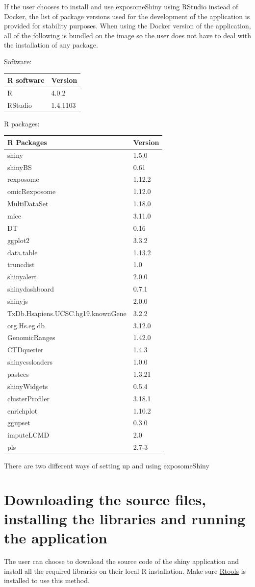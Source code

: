 \documentclass[
]{book}
\begin{document}
If the user chooses to install and use exposomeShiny using RStudio instead of Docker, the list of package versions used for the development of the application is provided for stability purposes. When using the Docker version of the application, all of the following is bundled on the image so the user does not have to deal with the installation of any package.

Software:

\begin{longtable}[]{@{}ll@{}}
\toprule
R software & Version\tabularnewline
\midrule
\endhead
R & 4.0.2\tabularnewline
RStudio & 1.4.1103\tabularnewline
\bottomrule
\end{longtable}

R packages:

\begin{longtable}[]{@{}ll@{}}
\toprule
R Packages & Version\tabularnewline
\midrule
\endhead
shiny & 1.5.0\tabularnewline
shinyBS & 0.61\tabularnewline
rexposome & 1.12.2\tabularnewline
omicRexposome & 1.12.0\tabularnewline
MultiDataSet & 1.18.0\tabularnewline
mice & 3.11.0\tabularnewline
DT & 0.16\tabularnewline
ggplot2 & 3.3.2\tabularnewline
data.table & 1.13.2\tabularnewline
truncdist & 1.0\tabularnewline
shinyalert & 2.0.0\tabularnewline
shinydashboard & 0.7.1\tabularnewline
shinyjs & 2.0.0\tabularnewline
TxDb.Hsapiens.UCSC.hg19.knownGene & 3.2.2\tabularnewline
org.Hs.eg.db & 3.12.0\tabularnewline
GenomicRanges & 1.42.0\tabularnewline
CTDquerier & 1.4.3\tabularnewline
shinycssloaders & 1.0.0\tabularnewline
pastecs & 1.3.21\tabularnewline
shinyWidgets & 0.5.4\tabularnewline
clusterProfiler & 3.18.1\tabularnewline
enrichplot & 1.10.2\tabularnewline
ggupset & 0.3.0\tabularnewline
imputeLCMD & 2.0\tabularnewline
pls & 2.7-3\tabularnewline
\bottomrule
\end{longtable}

There are two different ways of setting up and using exposomeShiny

\hypertarget{downloading-the-source-files-installing-the-libraries-and-running-the-application}{%
\section{Downloading the source files, installing the libraries and running the application}\label{downloading-the-source-files-installing-the-libraries-and-running-the-application}}

The user can choose to download the source code of the shiny application and install all the required libraries on their local R installation. Make sure \href{https://cran.r-project.org/bin/windows/Rtools/history.html}{Rtools} is installed to use this method.
\end{document}
